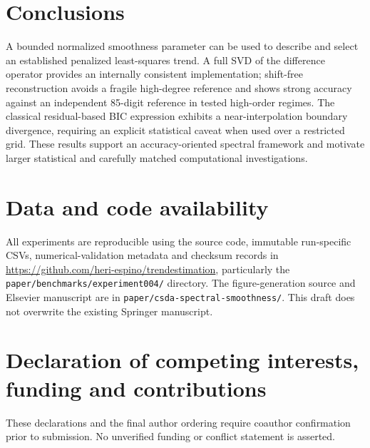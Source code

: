 \section{Conclusions}
A bounded normalized smoothness parameter can be used to describe and select an established penalized least-squares trend. A full SVD of the difference operator provides an internally consistent implementation; shift-free reconstruction avoids a fragile high-degree reference and shows strong accuracy against an independent 85-digit reference in tested high-order regimes. The classical residual-based BIC expression exhibits a near-interpolation boundary divergence, requiring an explicit statistical caveat when used over a restricted grid. These results support an accuracy-oriented spectral framework and motivate larger statistical and carefully matched computational investigations.

\section*{Data and code availability}
All experiments are reproducible using the source code, immutable run-specific CSVs, numerical-validation metadata and checksum records in \url{https://github.com/heri-espino/trendestimation}, particularly the \texttt{paper/benchmarks/experiment004/} directory. The figure-generation source and Elsevier manuscript are in \texttt{paper/csda-spectral-smoothness/}. This draft does not overwrite the existing Springer manuscript.

\section*{Declaration of competing interests, funding and contributions}
These declarations and the final author ordering require coauthor confirmation prior to submission. No unverified funding or conflict statement is asserted.

